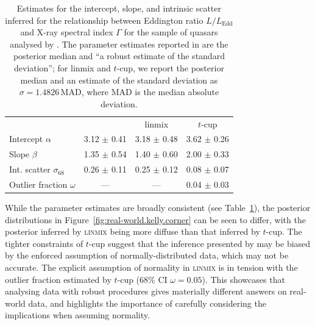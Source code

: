 \documentclass[fleqn,usenatbib]{rasti}
\begin{document}
\begin{table}
	\centering
	\caption{Estimates for the intercept, slope, and intrinsic scatter inferred
	for the relationship between Eddington ratio $L / L_{\text{Edd}}$ and X-ray
	spectral index $\Gamma$ for the sample of quasars analysed by
	\citet{Kelly:2007}. The parameter estimates reported in \citet{Kelly:2007}
	are the posterior median and ``a robust estimate of the standard
	deviation''; for linmix and $t$-cup, we report the posterior median and an
	estimate of the standard deviation as $\sigma = 1.4826 \, \text{MAD}$, where
	MAD is the median absolute deviation.}
	\label{tab:real-world.kelly.params}
	\begin{tabular}{lccc} %
                               & \citet{Kelly:2007} & linmix   & $t$-cup       \\
    Intercept $\alpha$         & 3.12 $\pm$ 0.41 & 3.18 $\pm$ 0.48 & 3.62 $\pm$ 0.26 \\
    Slope $\beta$              & 1.35 $\pm$ 0.54 & 1.40 $\pm$ 0.60 & 2.00 $\pm$ 0.33 \\
    Int. scatter $\sigma_{68}$ & 0.26 $\pm$ 0.11 & 0.25 $\pm$ 0.12 & 0.08 $\pm$ 0.07 \\
    Outlier fraction $\omega$  &      ---      &      ---      & 0.04 $\pm$ 0.03 \\
\end{tabular}
\end{table}

While the parameter estimates are broadly consistent (see
Table~\ref{tab:real-world.kelly.params}), the posterior distributions in
Figure~\ref{fig:real-world.kelly.corner} can be seen to differ, with the
posterior inferred by \textsc{linmix} being more diffuse than that inferred by
$t$-cup.  The tighter constraints of $t$-cup suggest that the inference
presented by \citet{Kelly:2007} may be biased by the enforced assumption of
normally-distributed data, which may not be accurate. The explicit assumption of
normality in \textsc{linmix} is in tension with the outlier fraction estimated
by $t$-cup (68\% CI $\omega = 0.05$).
This showcases that analysing data with robust procedures gives materially
different answers on real-world data, and highlights the importance of carefully
considering the implications when assuming normality.
\end{document}
